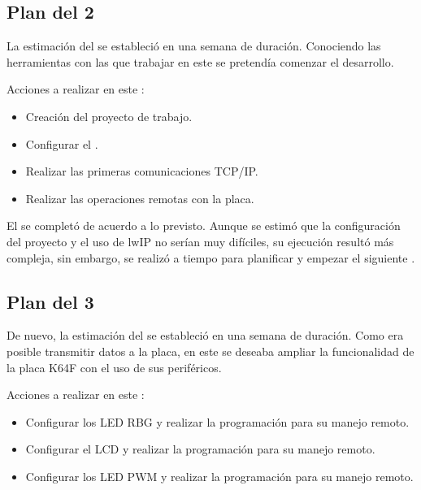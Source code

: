 \clearpage

\subsection{Plan del  2} \label{sec:plan-s2}
La estimación del  se estableció en una semana de
duración. Conociendo las herramientas con las que trabajar en este
 se pretendía comenzar el desarrollo.

Acciones a realizar en este :
\begin{itemize}
  \item Creación del proyecto de trabajo.
  \item Configurar el .
  \item Realizar las primeras comunicaciones TCP/IP.  
  \item Realizar las operaciones remotas con la placa.
\end{itemize}


El  se completó de acuerdo a lo previsto. Aunque se 
estimó que la configuración del proyecto y el uso de lwIP no serían muy
difíciles, su ejecución resultó más compleja, sin embargo, se realizó a tiempo
para planificar y empezar el siguiente .

\clearpage

\subsection{Plan del  3} \label{sec:plan-s3}
De nuevo, la estimación del  se estableció en una semana
de duración. Como era posible transmitir datos a la placa, en este
 se deseaba ampliar la funcionalidad de la placa K64F
con el uso de sus periféricos.

Acciones a realizar en este :
\begin{itemize}
  \item Configurar los LED RBG y realizar la programación para su manejo remoto.
  \item Configurar el LCD y realizar la programación para su manejo remoto. 
  \item Configurar los LED PWM y realizar la programación para su manejo remoto.
\end{itemize}

